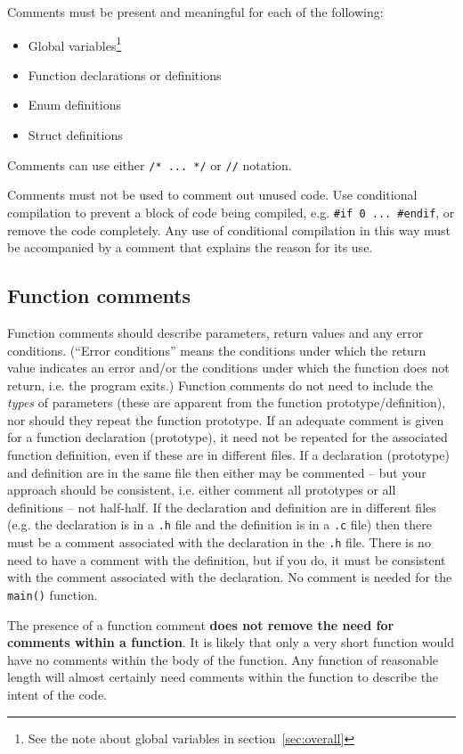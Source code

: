 \documentclass{article}
\begin{document}
Comments must be present and meaningful for each of the following:
\begin{itemize}
    \item Global variables\footnote{See the note about global variables in section~\ref{sec:overall}}
    \item Function declarations or definitions
    \item Enum definitions
    \item Struct definitions
\end{itemize}

Comments can use either \texttt{/* ... */} or \texttt{//} notation.

Comments must not be used to comment out unused code. Use conditional compilation to prevent a block of
code being compiled, e.g. \texttt{\#if 0 ... \#endif}, or remove the code completely. Any use of conditional compilation in
this way must be accompanied by a comment that explains the reason for its use.

\subsection{Function comments}
Function comments should describe parameters, return values and any error conditions. (``Error conditions'' means
the conditions under which the return value indicates an error and/or the conditions under which the 
function does not return, i.e. the program exits.)
Function comments do not need to include the \textit{types} of parameters (these are apparent from the function prototype/definition), 
nor should they repeat the function prototype. If an adequate comment is given for a function 
declaration (prototype), it need not be repeated for the associated function definition, even if these are in 
different files. If a declaration (prototype) and
definition are in the same file then either may be commented -- but your approach should be consistent, i.e. either comment
all prototypes or all definitions -- not half-half. If the declaration and definition are in different files
(e.g. the declaration is in a \texttt{.h} file and the definition is in a \texttt{.c} file) then there must be a comment
associated with the declaration in the \texttt{.h} file. There is no need to have a comment with the definition, 
but if you do, it must be consistent with the comment associated with the declaration.
No comment is needed for the \texttt{main()} function.

The presence of a function comment \textbf{does not remove the need for comments within a function}. It is likely that only a very short
function would have no comments within the body of the function. Any function of reasonable length will almost certainly need
comments within the function to describe the intent of the code.
\end{document}
